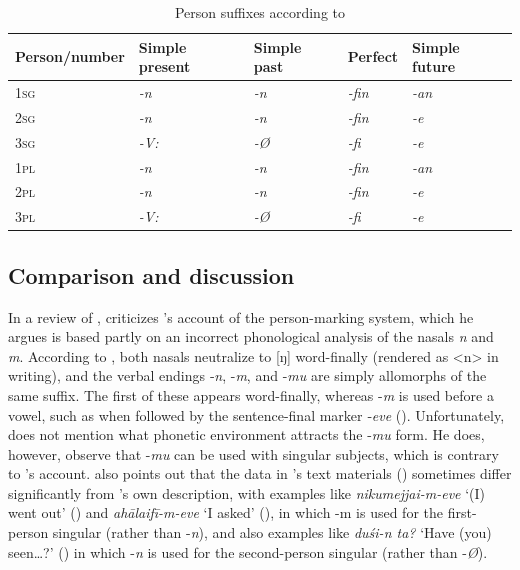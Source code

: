 \documentclass[output=paper]{langsci/langscibook}
\begin{document}
\begin{table}
\begin{tabularx}{\textwidth}{lllll}
\hline
\textbf{Person/number} & \textbf{Simple present} & \textbf{Simple past} & \textbf{Perfect} & \textbf{Simple future}\\
\hline
\textsc{	1sg	}	&	\textit{	-n	}	&	\textit{	-n	}	&	\textit{	-fin	}	&	\textit{	-an	}	\\
\textsc{	2sg	}	&	\textit{	-n	}	&	\textit{	-n	}	&	\textit{	-fin	}	&	\textit{	-e	}	\\
\textsc{	3sg	}	&	\textit{	-V:	}	&	\textit{	-Ø	}	&	\textit{	-fi	}	&	\textit{	-e	}	\\
\textsc{	1pl	}	&	\textit{	-n	}	&	\textit{	-n	}	&	\textit{	-fin	}	&	\textit{	-an	}	\\
\textsc{	2pl	}	&	\textit{	-n	}	&	\textit{	-n	}	&	\textit{	-fin	}	&	\textit{	-e	}	\\
\textsc{	3pl	}	&	\textit{	-V:	}	&	\textit{	-Ø	}	&	\textit{	-fi	}	&	\textit{	-e	}	\\
\hline
\end{tabularx}
\caption{Person suffixes according to \cite{CainGair2000}}
\label{tab:jl3}	
\end{table}

\subsection{Comparison and discussion}\label{s:jl2-3}

In a review of \cite{Fritz2002}, \cite{Cain2004} criticizes \citeauthor{Fritz2002}’s account of the person-marking system, which he argues is based partly on an incorrect phonological analysis of the nasals \textit{n} and \textit{m}. According to \citeauthor{Cain2004}, both nasals neutralize to [ŋ] word-finally (rendered as <n> in writing), and the verbal endings ‑\textit{n}, -\textit{m}, and -\textit{mu} are simply allomorphs of the same suffix. The first of these appears word-finally, whereas -\textit{m} is used before a vowel, such as when followed by the sentence-final marker ‑\textit{eve} (\citealt[355]{Cain2004}). Unfortunately, \citeauthor{Cain2004} does not mention what phonetic environment attracts the -\textit{mu} form. He does, however, observe that -\textit{mu} can be used with singular subjects, which is contrary to \citeauthor{Fritz2002}’s account. \citeauthor{Cain2004} also points out that the data in \citeauthor{Fritz2002}’s text materials (\citealt[Vol. 2]{Fritz2002}) sometimes differ significantly from \citeauthor{Fritz2002}’s own description, with examples like \textit{nikumejjai-m-eve} ‘(I) went out’ (\citeyear[Vol. 2, 136]{Fritz2002}) and \textit{ahālaifī-m-eve} ‘I asked’ (\citeyear[Vol. 2, 141]{Fritz2002}), in which -m is used for the first-person singular (rather than -\textit{n}), and also examples like \textit{duśi-n ta?} ‘Have (you) seen…?’ (\citeyear[(Vol. 2) 154]{Fritz2002}) in which -\textit{n} is used for the second-person singular (rather than -\textit{Ø}). 
\end{document}

